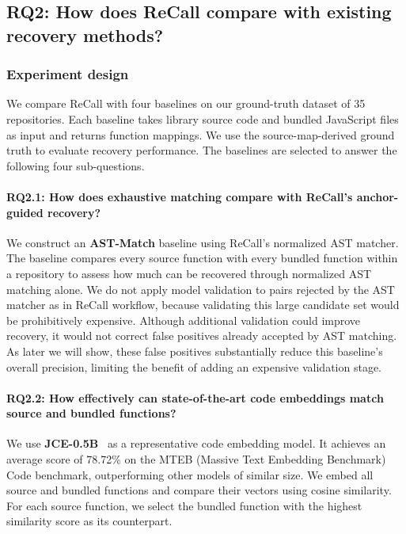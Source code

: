 \subsection{RQ2: How does ReCall compare with existing recovery methods?}
\label{sec:rq2}

\subsubsection{Experiment design}
We compare ReCall with four baselines on our ground-truth dataset of 35 repositories. Each baseline takes library source code and bundled JavaScript files as input and returns function mappings. We use the source-map-derived ground truth to evaluate recovery performance. The baselines are selected to answer the following four sub-questions.


\paragraph{RQ2.1: How does exhaustive matching compare with ReCall's anchor-guided recovery?}
We construct an \textbf{AST-Match} baseline using ReCall’s normalized AST matcher. The baseline compares every source function with every bundled function within a repository to assess how much can be recovered through normalized AST matching alone. We do not apply model validation to pairs rejected by the AST matcher as in ReCall workflow, because validating this large candidate set would be prohibitively expensive. Although additional validation could improve recovery, it would not correct false positives already accepted by AST matching. As later we will show, these false positives substantially reduce this baseline’s overall precision, limiting the benefit of adding an expensive validation stage.


\paragraph{RQ2.2: How effectively can state-of-the-art code embeddings match source and bundled functions?}
We use \textbf{JCE-0.5B}~\cite{kryvosheieva2025efficient} as a representative code embedding model. It achieves an average score of 78.72\% on the MTEB (Massive Text Embedding Benchmark) Code benchmark, outperforming other models of similar size. We embed all source and bundled functions and compare their vectors using cosine similarity. For each source function, we select the bundled function with the highest similarity score as its counterpart.

